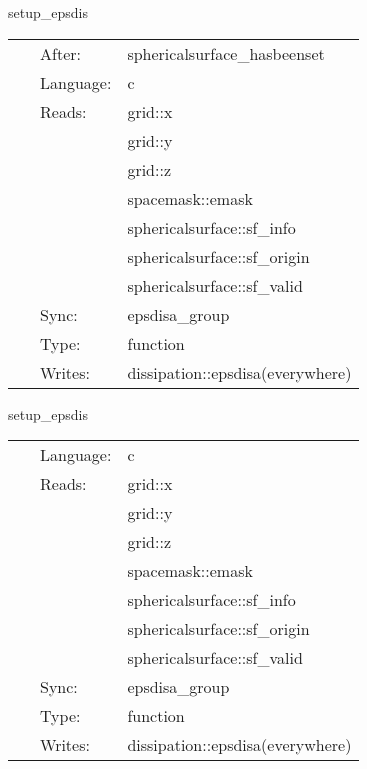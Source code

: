 \vspace{5mm}


\hspace{5mm} setup\_epsdis 

\hspace{5mm}{\it setup spatially varying dissipation } 


\hspace{5mm}

 \begin{tabular*}{160mm}{cll} 
~ & After:  & sphericalsurface\_hasbeenset \\ 
~ & Language:  & c \\ 
~ & Reads:  & grid::x \\ 
~& ~ &grid::y\\ 
~& ~ &grid::z\\ 
~& ~ &spacemask::emask\\ 
~& ~ &sphericalsurface::sf\_info\\ 
~& ~ &sphericalsurface::sf\_origin\\ 
~& ~ &sphericalsurface::sf\_valid\\ 
~ & Sync:  & epsdisa\_group \\ 
~ & Type:  & function \\ 
~ & Writes:  & dissipation::epsdisa(everywhere) \\ 
\end{tabular*} 


\vspace{5mm}


\hspace{5mm} setup\_epsdis 

\hspace{5mm}{\it setup spatially varying dissipation } 


\hspace{5mm}

 \begin{tabular*}{160mm}{cll} 
~ & Language:  & c \\ 
~ & Reads:  & grid::x \\ 
~& ~ &grid::y\\ 
~& ~ &grid::z\\ 
~& ~ &spacemask::emask\\ 
~& ~ &sphericalsurface::sf\_info\\ 
~& ~ &sphericalsurface::sf\_origin\\ 
~& ~ &sphericalsurface::sf\_valid\\ 
~ & Sync:  & epsdisa\_group \\ 
~ & Type:  & function \\ 
~ & Writes:  & dissipation::epsdisa(everywhere) \\ 
\end{tabular*} 


